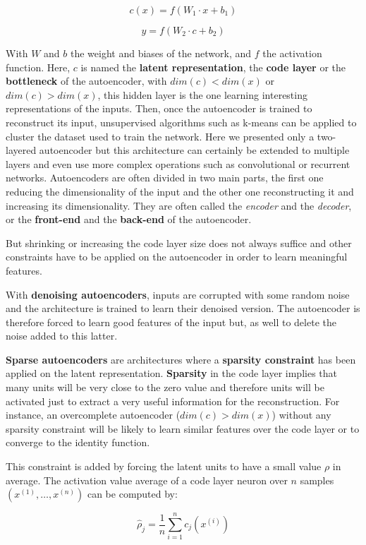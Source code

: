 \documentclass[master, tikz, final,11pt, dvipdfmx]{iscs-thesis}
\begin{document}
\[
c(x) = f(W_1 \cdot x + b_1)
\]

\[
y = f(W_2 \cdot c + b_2)
\]

With $W$ and $b$ the weight and biases of the network, and $f$ the activation function. Here, $c$ is named the \textbf{latent representation},  the \textbf{code layer} or the \textbf{bottleneck} of the autoencoder, with $dim(c) < dim(x)$ or $dim(c) > dim(x)$, this hidden layer is the one learning interesting representations of the inputs. Then, once the autoencoder is trained to reconstruct its input, unsupervised algorithms such as k-means can be applied to cluster the dataset used to train the network.
Here we presented only a two-layered autoencoder but this architecture can certainly be extended to multiple layers and even use more complex operations such as convolutional or recurrent networks. Autoencoders are often divided in two main parts, the first one reducing the dimensionality of the input and the other one reconstructing it and increasing its dimensionality. They are often called the \textit{encoder} and the \textit{decoder}, or the \textbf{front-end} and the \textbf{back-end} of the autoencoder.

But shrinking or increasing the code layer size does not always suffice and other constraints have to be applied on the autoencoder in order to learn meaningful features.

With \textbf{denoising autoencoders}, inputs are corrupted with some random noise and the architecture is trained to learn their denoised version. The autoencoder is therefore forced to learn good features of the input but, as well to delete the noise added to this latter.

\textbf{Sparse autoencoders} are architectures where a \textbf{sparsity constraint} has been applied on the latent representation. \textbf{Sparsity} in the code layer implies that many units will be very close to the zero value and therefore units will be activated just to extract a very useful information for the reconstruction. For instance, an overcomplete autoencoder ($dim(c) > dim(x)$) without any sparsity constraint will be likely to learn similar features over the code layer or to converge to the identity function.

This constraint is added by forcing the latent units to have a small value $\rho$ in average. The activation value average of a code layer neuron over $n$ samples $(x^{(1)}, \dots, x^{(n)})$ can be computed by:

\[
\hat{\rho}_j = \frac{1}{n}\sum_{i=1}^n{c_j(x^{(i)})}
\]
\end{document}
